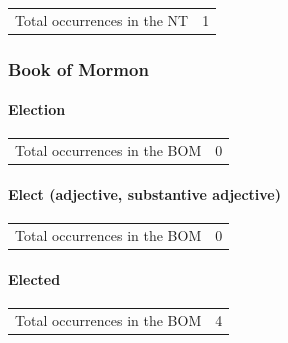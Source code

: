 				\begin{tabular}{ll}
					Total occurrences in the NT & 1
				\end{tabular}
				
				\begin{compactdesc}
					\item[Some NT uses] \textbf{}
						\begin{compactdesc}
							\item[{\hyperref[1PETER-5-13]{1 Peter 5:13}}]
						\end{compactdesc}
				\end{compactdesc}
				
		
	\subsubsection{Book of Mormon} %
		\label{ELECTION-BOM}
		
		\paragraph{Election}
	
			\begin{tabular}{ll}
				Total occurrences in the BOM & 0
			\end{tabular}
			
		\paragraph{Elect (adjective, substantive adjective)}
	
			\begin{tabular}{ll}
				Total occurrences in the BOM & 0
			\end{tabular}
			
		\paragraph{Elected}
	
			\begin{tabular}{ll}
				Total occurrences in the BOM & 4
			\end{tabular}
			

